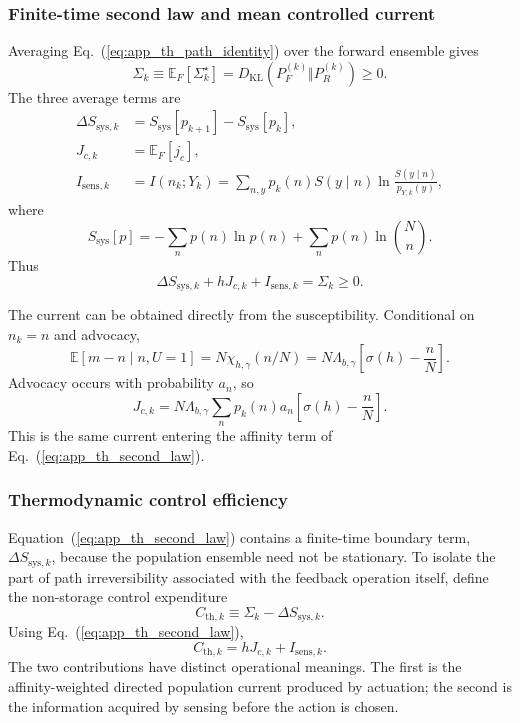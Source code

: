 \subsubsection{Finite-time second law and mean controlled current}

Averaging Eq.~(\ref{eq:app_th_path_identity}) over the forward ensemble gives
\begin{equation}
\Sigma_k
\equiv
\mathbb E_F[\Sigma_k^\star]
=
D_{\mathrm{KL}}\!\left(P_F^{(k)}\Vert P_R^{(k)}\right)
\ge0.
\label{eq:app_th_kl}
\end{equation}
The three average terms are
\begin{align}
\Delta S_{\mathrm{sys},k}
&=S_{\mathrm{sys}}[p_{k+1}]-S_{\mathrm{sys}}[p_k],\\
J_{c,k}&=\mathbb E_F[j_c],\\
I_{\mathrm{sens},k}
&=I(n_k;Y_k)
=\sum_{n,y}p_k(n)S(y\mid n)
\ln\frac{S(y\mid n)}{p_{Y,k}(y)},
\end{align}
where
\begin{equation}
S_{\mathrm{sys}}[p]
=-\sum_n p(n)\ln p(n)
+\sum_n p(n)\ln\binom{N}{n}.
\label{eq:app_th_system_entropy}
\end{equation}
Thus
\begin{equation}
\boxed{
\Delta S_{\mathrm{sys},k}
+hJ_{c,k}
+I_{\mathrm{sens},k}
=\Sigma_k\ge0.}
\label{eq:app_th_second_law}
\end{equation}

The current can be obtained directly from the susceptibility. Conditional on
$n_k=n$ and advocacy,
\[
\mathbb E[m-n\mid n,U=1]
=N\chi_{h,\gamma}(n/N)
=N\Lambda_{b,\gamma}
\left[\sigma(h)-\frac{n}{N}\right].
\]
Advocacy occurs with probability $a_n$, so
\begin{equation}
\boxed{
J_{c,k}
=N\Lambda_{b,\gamma}
\sum_n p_k(n)a_n
\left[\sigma(h)-\frac{n}{N}\right].}
\label{eq:app_th_mean_current}
\end{equation}
This is the same current entering the affinity term of
Eq.~(\ref{eq:app_th_second_law}).

\subsubsection{Thermodynamic control efficiency}

Equation~(\ref{eq:app_th_second_law}) contains a finite-time boundary term,
$\Delta S_{\mathrm{sys},k}$, because the population ensemble need not be
stationary. To isolate the part of path irreversibility associated with the
feedback operation itself, define the non-storage control expenditure
\begin{equation}
C_{\mathrm{th},k}
\equiv
\Sigma_k-\Delta S_{\mathrm{sys},k}.
\label{eq:app_th_expenditure}
\end{equation}
Using Eq.~(\ref{eq:app_th_second_law}),
\begin{equation}
\boxed{
C_{\mathrm{th},k}
=hJ_{c,k}+I_{\mathrm{sens},k}.}
\label{eq:app_th_expenditure_decomposition}
\end{equation}
The two contributions have distinct operational meanings. The first is the
affinity-weighted directed population current produced by actuation; the second
is the information acquired by sensing before the action is chosen.

